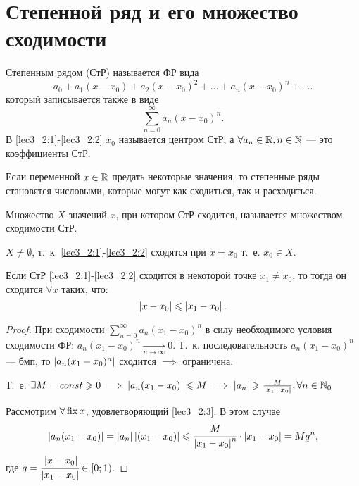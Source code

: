 \documentclass[../../main.tex]{subfiles}
\begin{document}
\section{Степенной ряд и его множество сходимости}

Степенным рядом (СтР) называется ФР вида
\begin{equation}\label{lec3_2:1}
a_0+a_1(x-x_0)+a_2(x-x_0)^2+\dots+a_n(x-x_0)^n+\dots.
\end{equation}
который записывается также в виде
\begin{equation}\label{lec3_2:2}
\sum_{n=0}^{\infty}a_n(x-x_0)^n.
\end{equation}
В \eqref{lec3_2:1}-\eqref{lec3_2:2} $x_0$ называется центром СтР, 
а $\forall a_n \in \mathbb{R}, n\in \mathbb{N}$ --- это коэффициенты СтР.

Если переменной $x\in\mathbb{R}$ предать некоторые значения, 
то степенные ряды становятся числовыми, которые могут как сходиться, 
так и расходиться.

Множество $X$ значений $x$, при котором СтР сходится, 
называется множеством сходимости СтР. 

$X \neq \emptyset$, т.~к. \eqref{lec3_2:1}-\eqref{lec3_2:2} 
сходятся при $x=x_0$ т.~е. $x_0\in X$.

\begin{lem}
	Если СтР \eqref{lec3_2:1}-\eqref{lec3_2:2} сходится в некоторой 
	точке $x_1\neq x_0$, то тогда он сходится $\forall x$ таких, что:
	\begin{equation}\label{lec3_2:3}
		 \left|{ x - x_0}\right| \leqslant \left|{x_1 - x_0}\right|.
	\end{equation}
\end{lem}
\begin{proof}
	При сходимости $\sum_{n=0}^{\infty}a_n(x_1-x_0)^n$ в силу необходимого
	 условия сходимости ФР: $a_n(x_1-x_0)^n\underset{n\to\infty}{\rightarrow}0$. 
	Т.~к. последовательность $a_n(x_1-x_0)^n$ --- бмп, 
	то $\left|{a_n(x_1-x_0)^n}\right|$ сходится $\implies$ ограничена.
	
	Т.~е. $\exists M=const \geqslant0 \implies \left|{a_n(x_1-x_0)}\right| \leqslant M
	\implies \left|{a_n}\right|\geqslant \frac{M}{\left|{x_1-x_0}\right|}, \forall n\in\mathbb{N}_0$
	
	Рассмотрим $\forall \operatorname{fix} x $, удовлетворяющий \eqref{lec3_2:3}. 
	В этом случае  
	\begin{equation*}
		\left|{a_n(x_1-x_0)}\right| = \left|{a_n}\right|\left|{(x_1-x_0)}\right|\leqslant 
		\cfrac{M}{\left|{x_1-x_0}\right|^n}\cdot \left|{x_1-x_0}\right|=Mq^n,
	\end{equation*}
	где $q=\cfrac{\left|{x-x_0}\right|}{\left|{x_1-x_0}\right|}\in{\left[0;1\right)}.$
\end{proof}	
\end{document}
